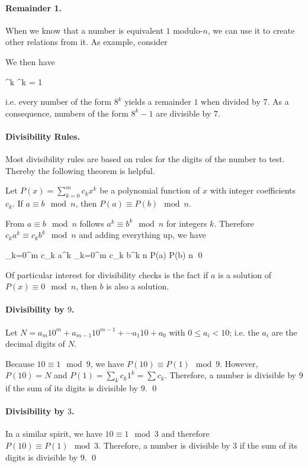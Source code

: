 \paragraph{Remainder 1.} When we know that a number is equivalent $1$ modulo-$n$, we can use it to create other relations from it. As example, consider 

  
\eee

We then have 

^k ^k = 1 
\eee

i.e. every number of the form $8^k$ yields a remainder $1$ when divided by $7$. As a consequence, numbers of the form $8^k - 1$ are divisible by $7$.


\paragraph{Divisibility Rules.} Most divisibility rules are based on rules for the digits of the number to test. Thereby the following theorem is helpful.

\begin{theorem}
    Let $P(x) = \sum_{k=0}^m c_k x^k$ be a polynomial function of $x$ with integer coefficients $c_k$. If $a \equiv b \mod n$, then $P(a) \equiv P(b) \mod n$.
\end{theorem}

From $a \equiv b \mod n$ follows $a^k \equiv b^k \mod n$ for integers $k$. Therefore $c_k a^k \equiv c_k b^k \mod n$ and adding everything up, we have

\bee
\sum_{k=0}^m c_k a^k \equiv \sum_{k=0}^m c_k b^k \mod n \rightarrow P(a) \equiv P(b) \mod n \qed
\eee

Of particular interest for divisibility checks is the fact if $a$ is a solution of $P(x) \equiv 0 \mod n$, then $b$ is also a solution.

\paragraph{Divisibility by $9$.} Let $N = a_m 10^m + a_{m-1} 10^{m-1} + \cdots a_1 10 + a_0$ with $0 \leq a_i < 10$; i.e. the $a_i$ are the decimal digits of $N$.

Because $10 \equiv 1 \mod 9$, we have $P(10) \equiv P(1) \mod 9$. However, $P(10) = N$ and $P(1) = \sum_k c_k 1^k = \sum c_k$. Therefore, a number is divisible by $9$ if the sum of its digits is divisible by $9$. \qed

\paragraph{Divisibility by $3$.} In a similar spirit, we have $10 \equiv 1 \mod 3$ and therefore $P(10) \equiv P(1) \mod 3$. Therefore, a number is divisible by $3$ if the sum of its digits is divisible by $9$. \qed


